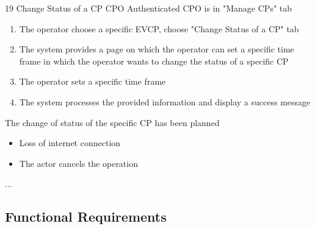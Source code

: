 \usecase
{19}
{Change Status of a CP} %
{CPO} %
{Authenticated CPO is in "Manage CPs" tab} %
{ %
    \begin{enumerate}
        \item The operator choose a specific EVCP, choose "Change Status of a CP" tab
        \item The system provides a page on which the operator can set a specific time frame in which the operator wants to change the status of a specific CP
        \item The operator sets a specific time frame
        \item The system processes the provided information and display a success message
    \end{enumerate}
}
{The change of status of the specific CP has been planned} %
{ %
    \begin{itemize}
        \item Loss of internet connection
        \item The actor cancels the operation
    \end{itemize}
}
{ %
    ...
}

\subsection{Functional Requirements}


